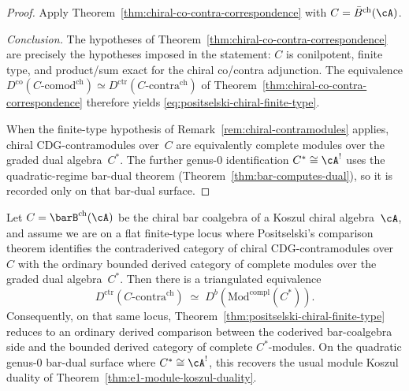 \begin{proof}
Apply Theorem~\ref{thm:chiral-co-contra-correspondence} with
$C = \bar{B}^{\mathrm{ch}}(\cA)$.

\emph{Conclusion.}
The hypotheses of Theorem~\ref{thm:chiral-co-contra-correspondence}
are precisely the hypotheses imposed in the statement: $C$ is
conilpotent, finite type, and product/sum exact for the chiral
co/contra adjunction. The equivalence
$D^{\mathrm{co}}(C\text{-}\mathrm{comod}^{\mathrm{ch}})
\simeq D^{\mathrm{ctr}}(C\text{-}\mathrm{contra}^{\mathrm{ch}})$
of Theorem~\ref{thm:chiral-co-contra-correspondence} therefore yields
\eqref{eq:positselski-chiral-finite-type}.

When the finite-type hypothesis of
Remark~\ref{rem:chiral-contramodules} applies, chiral
CDG-contramodules over~$C$ are equivalently complete modules over the
graded dual algebra~$C^*$. The further genus-$0$ identification
$C^* \cong \cA^!$ uses the quadratic-regime bar-dual theorem
\textup{(}Theorem~\textup{\ref{thm:bar-computes-dual}}\textup{)}, so it
is recorded only on that bar-dual surface.
\end{proof}

\begin{theorem}
\label{thm:completed-dual-finite-type-reduction}
Let $C=\barB^{\mathrm{ch}}(\cA)$ be the chiral bar coalgebra of a
Koszul chiral algebra~$\cA$, and assume we are on a flat finite-type
locus where Positselski's comparison theorem identifies the
contraderived category of chiral CDG-contramodules over~$C$ with the
ordinary bounded derived category of complete modules over the graded
dual algebra~$C^*$. Then there is a triangulated equivalence
\begin{equation}\label{eq:completed-dual-finite-type-reduction}
D^{\mathrm{ctr}}(C\text{-}\mathrm{contra}^{\mathrm{ch}})
\;\simeq\;
D^b(\mathrm{Mod}^{\mathrm{compl}}(C^*)).
\end{equation}
Consequently, on that same locus, Theorem~\textup{\ref{thm:positselski-chiral-finite-type}}
reduces to an ordinary derived comparison between the coderived
bar-coalgebra side and the bounded derived category of complete
$C^*$-modules. On the quadratic genus-$0$ bar-dual surface where
$C^*\cong\cA^!$, this recovers the usual module Koszul duality of
Theorem~\textup{\ref{thm:e1-module-koszul-duality}}.
\end{theorem}

